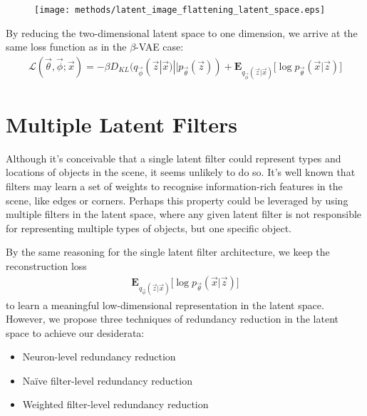 \begin{figure}[h!]
\centering
\captionsetup{justification=centering}
\texttt{[image: methods/latent\_image\_flattening\_latent\_space.eps]}
\label{fig:latent_image_flattening_latent_space}
\end{figure}

By reducing the two-dimensional latent space to one dimension, we arrive at the same loss function as in the $\beta$-VAE case:
\begin{align}
\mathcal{L}(\vec{\theta}, \vec{\phi}; \vec{x}) = -\beta D_{KL}(q_{\vec{\phi}}(\vec{z}|\vec{x}) || p_{\vec{\theta}}(\vec{z})) + \mathbf{E}_{q_{\vec{\phi}}(\vec{z}|\vec{x})}\big[\log p_{\vec{\theta}}(\vec{x} | \vec{z}) \big]
\end{align}


%
%
%
%
%
\section{Multiple Latent Filters}

Although it's conceivable that a single latent filter could represent types and locations of objects in the scene, it seems unlikely to do so. It's well known that filters may learn a set of weights to recognise information-rich features in the scene, like edges or corners. Perhaps this property could be leveraged by using multiple filters in the latent space, where any given latent filter is not responsible for representing multiple types of objects, but one specific object.

By the same reasoning for the single latent filter architecture, we keep the reconstruction loss 
\begin{align}
\mathbf{E}_{q_{\vec{\phi}}(\vec{z}|\vec{x})}\big[\log p_{\vec{\theta}}(\vec{x} | \vec{z}) \big]
\end{align}
to learn a meaningful low-dimensional representation in the latent space. However, we propose three techniques of redundancy reduction in the latent space to achieve our desiderata:
\begin{itemize}
\item Neuron-level redundancy reduction
\item Na\"{i}ve filter-level redundancy reduction
\item Weighted filter-level redundancy reduction
\end{itemize}

%
%
